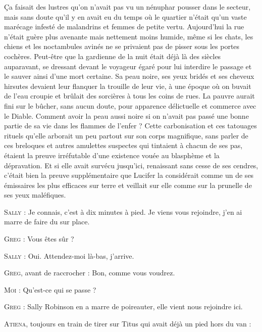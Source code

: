 \illusloflabel{}%
Ça faisait des lustres qu’on n’avait pas vu un nénuphar pousser dans le secteur, mais sans doute qu’il y en avait eu du temps où le quartier n’était qu’un vaste marécage infesté de malandrins et femmes de petite vertu. Aujourd’hui la rue n’était guère plus avenante mais nettement moins humide, même si les chats, les chiens et les noctambules avinés ne se privaient pas de pisser sous les portes cochères. Peut-être que la gardienne de la nuit était déjà là des siècles auparavant, se dressant devant le voyageur égaré pour lui interdire le passage et le sauver ainsi d’une mort certaine. Sa peau noire, ses yeux bridés et ses cheveux hirsutes devaient leur flanquer la trouille de leur vie, à une époque où on buvait de l’eau croupie et brûlait des sorcières à tous les coins de rues. La pauvre aurait fini sur le bûcher, sans aucun doute, pour apparence délictuelle et commerce avec le Diable. Comment avoir la peau aussi noire si on n’avait pas passé une bonne partie de sa vie dans les flammes de l’enfer ? Cette carbonisation et ces tatouages rituels qu’elle arborait un peu partout sur son corps magnifique, sans parler de ces breloques et autres amulettes suspectes qui tintaient à chacun de ses pas, étaient la preuve irréfutable d’une existence vouée au blasphème et la dépravation. Et si elle avait survécu jusqu’ici, renaissant sans cesse de ses cendres, c’était bien la preuve supplémentaire que Lucifer la considérait comme un de ses émissaires les plus efficaces sur terre et veillait sur elle comme sur la prunelle de ses yeux maléfiques.

\begin{dialogue}

\textsc{Sally} : Je connais, c’est à dix minutes à pied. Je viens vous rejoindre, j’en ai marre de faire du sur place.

\textsc{Greg} : Vous êtes sûr ?

\textsc{Sally} : Oui. Attendez-moi là-bas, j’arrive.

\textsc{Greg}, avant de raccrocher : Bon, comme vous voudrez.

\textsc{Moi} : Qu’est-ce qui se passe ?

\textsc{Greg} : Sally Robinson en a marre de poireauter, elle vient nous rejoindre ici.

\textsc{Atiena}, toujours en train de tirer sur Titus qui avait déjà un pied hors du van : 

\end{dialogue}

